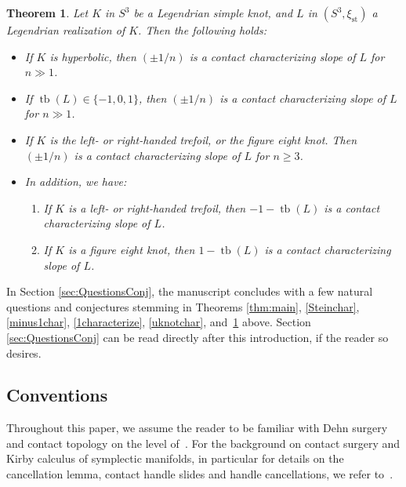 \documentclass[11pt]{amsart} %
\DeclareMathOperator{\tb}{tb}
\newcommand{\xist}{\xi_{\mathrm{st}}}
\theoremstyle{plain}
\newtheorem{thm}[Theorem]{Theorem}
\theoremstyle{definition}
\begin{document}
\begin{thm}\label{thm:reciprokal}
Let $K$ in $S^3$ be a Legendrian simple knot, and $L$ in $(S^3,\xist)$ a Legendrian realization of $K$. Then the following holds:

\begin{itemize}
	
	\item[(i)] If $K$ is hyperbolic, then $(\pm1/n)$ is a contact characterizing slope of $L$ for $n\gg1$.
	
	\item[(ii)] If $\tb(L)\in \{-1, 0, 1\}$, then $(\pm1/n)$ is a contact characterizing slope of $L$ for $n\gg1$.
	
	\item[(iii)] If $K$ is the left- or right-handed trefoil, or the figure eight knot. Then $(\pm1/n)$ is a contact characterizing slope of $L$ for $n\geq3$. 
	
	\item[(iv)] In addition, we have:
	
	\begin{enumerate}
			 
		\item If $K$ is a left- or right-handed trefoil, then $-1-\tb(L)$ is a contact characterizing slope of $L$.
		
		\item If $K$ is a figure eight knot, then $1-\tb(L)$ is a contact characterizing slope of $L$.
	\end{enumerate}	

\end{itemize}
\end{thm}

In Section \ref{sec:QuestionsConj}, the manuscript concludes with a few natural questions and conjectures stemming in Theorems \ref{thm:main}, \ref{Steinchar}, \ref{minus1char}, \ref{1characterize}, \ref{uknotchar}, and~\ref{thm:reciprokal} above. Section \ref{sec:QuestionsConj} can be read directly after this introduction, if the reader so desires.

\subsection*{Conventions}
Throughout this paper, we assume the reader to be familiar with Dehn surgery and contact topology on the level of~\cite{GompfStipsicz99, Geiges08}. %
For the background on contact surgery and Kirby calculus of symplectic manifolds, in particular for details on the cancellation lemma, contact handle slides and handle cancellations, we refer to~\cite{DingGeiges09, DingGeigesStipsicz04, EtnyreKegelOnaranPre}.  %
\end{document}
